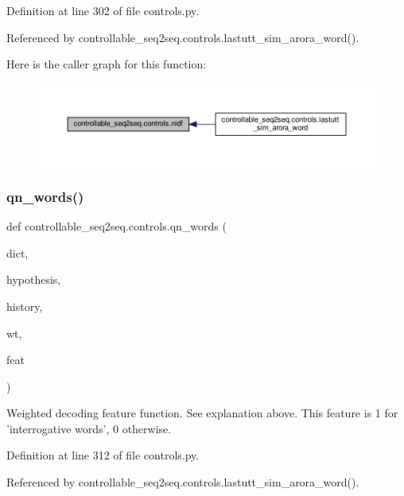Definition at line 302 of file controls.\+py.



Referenced by controllable\+\_\+seq2seq.\+controls.\+lastutt\+\_\+sim\+\_\+arora\+\_\+word().

Here is the caller graph for this function\+:
\nopagebreak
\begin{figure}[H]
\begin{center}
\leavevmode
\includegraphics[width=350pt]{namespacecontrollable__seq2seq_1_1controls_a06371a18df2fc3cc43efbbbacc94a0d5_icgraph}
\end{center}
\end{figure}
\mbox{\label{namespacecontrollable__seq2seq_1_1controls_a2abfb0ac45f5c1d4a05c638ea1e354c1}} 
\subsubsection{\texorpdfstring{qn\+\_\+words()}{qn\_words()}}
{\footnotesize\ttfamily def controllable\+\_\+seq2seq.\+controls.\+qn\+\_\+words (\begin{DoxyParamCaption}\item[{}]{dict,  }\item[{}]{hypothesis,  }\item[{}]{history,  }\item[{}]{wt,  }\item[{}]{feat }\end{DoxyParamCaption})}

\begin{DoxyVerb}Weighted decoding feature function. See explanation above.
This feature is 1 for 'interrogative words', 0 otherwise.
\end{DoxyVerb}
 

Definition at line 312 of file controls.\+py.



Referenced by controllable\+\_\+seq2seq.\+controls.\+lastutt\+\_\+sim\+\_\+arora\+\_\+word().

